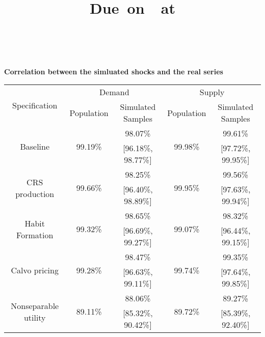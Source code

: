 \documentclass[12pt]{article}
\title{
    \vspace{2in}
    \textmd{\textbf{\hmwkTitle}}\\
    \normalsize\vspace{0.1in}\small{Due\ on\ \hmwkDueDate\ at \hmwTime}\\
    \vspace{0.1in}\large{\textit{\hmwkClassInstructor\ \hmwkClassTime}}
    \vspace{1.5in}
}
\author{\hmwkAuthorName}
\date{}
\begin{document}
\begin{center}
\large \textbf{Correlation between the simluated shocks and the real series}
\end{center}
\vspace{4pt}
\begin{center}
\begin{tabular}[b]{ccccc}
\hline
\multirow{2}{*}{Specification}   & \multicolumn{2}{c}{Demand} & \multicolumn{2}{c}{Supply}  \\
\cline{2-5}
                & Population  &  Simulated Samples  & Population &  Simulated Samples  \\
\hline
\multirow{2}{*}{Baseline} & \multirow{2}{*}{99.19\%} & 98.07\% & \multirow{2}{*}{99.98\%} & 99.61\%       \\
                          &    & [96.18\%, 98.77\%] &    & [97.72\%, 99.95\%]  \\
\hline
\multirow{2}{*}{CRS production} & \multirow{2}{*}{99.66\%} & 98.25\% & \multirow{2}{*}{99.95\%} & 99.56\%       \\
                          &    & [96.40\%, 98.89\%] &    & [97.63\%, 99.94\%]  \\
\hline
\multirow{2}{*}{Habit Formation} & \multirow{2}{*}{99.32\%} & 98.65\% & \multirow{2}{*}{99.07\%} & 98.32\%       \\
                          &    & [96.69\%, 99.27\%] &    & [96.44\%, 99.15\%]  \\
\hline
\multirow{2}{*}{Calvo pricing} & \multirow{2}{*}{99.28\%} & 98.47\% & \multirow{2}{*}{99.74\%} & 99.35\%       \\
                          &    & [96.63\%, 99.11\%] &    & [97.64\%, 99.85\%]  \\
\hline
\multirow{2}{*}{Nonseparable utility} & \multirow{2}{*}{89.11\%} & 88.06\% & \multirow{2}{*}{89.72\%} & 89.27\%       \\
                          &    & [85.32\%, 90.42\%] &    & [85.39\%, 92.40\%]  \\
\hline
\end{tabular}
\end{center}
\end{document}
